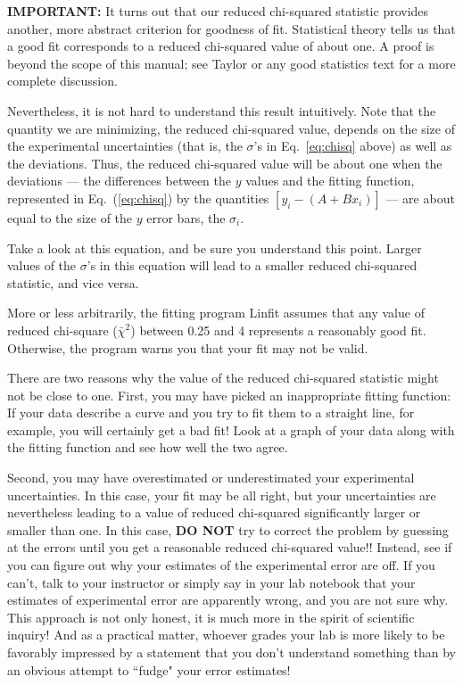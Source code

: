 {\bf IMPORTANT:}  It turns out that our reduced chi-squared statistic
provides another, more abstract criterion for goodness of fit.
Statistical theory tells us that a good fit corresponds to a reduced
chi-squared value of about one.  A proof is beyond the scope of
this manual; see Taylor or any good statistics text for a more
complete discussion.

Nevertheless, it is not hard to understand this result intuitively.
 Note that the quantity we are minimizing, the reduced
chi-squared value, depends on the size of the experimental
uncertainties (that is, the $\sigma$'s in Eq.~\ref{eq:chisq} above)
as well as the
deviations.   Thus, the reduced chi-squared value will be about one
when the deviations --- the differences between the $y$ values
and the fitting function, represented in Eq.~(\ref{eq:chisq}) by the
quantities $ \left[y_{i} -  (A + Bx_{i})\right] $ --- are about
equal to the size of the $y$ error bars, the $\sigma_i$.

Take a look at this equation, and be sure you understand
this point.  Larger values of the $\sigma$'s in this equation will
lead to a smaller reduced chi-squared statistic, and vice versa.

More or less arbitrarily, the fitting
program Linfit assumes that any value of reduced chi-square
($\bar{\chi}^2$) between 0.25 and 4 represents a
reasonably good fit.  Otherwise, the program warns you that your fit
may not be valid.

There are two reasons why the value of the reduced
chi-squared statistic might not be close to one.  First, you may have
picked an inappropriate fitting function: If your data describe a
curve and you try to fit them to a straight line, for example, you
will certainly get a bad fit!  Look at a graph of your data along with
the fitting function and see how well the two agree.

Second, you may have overestimated or underestimated your experimental
uncertainties.  In this case, your fit may be all right, but your
uncertainties are nevertheless leading to a value of reduced
chi-squared significantly larger or smaller than one.  In this case,
{\bf DO NOT} try to correct the problem by guessing at the errors until you
get a reasonable reduced chi-squared value!!  Instead, see if you can
figure out why your estimates of the experimental error are off.  If
you can't, talk to your instructor or simply say in your lab notebook
that your estimates of experimental error are apparently wrong, and
you are not sure why.  This approach is not only honest, it is much
more in the spirit of scientific inquiry!  And as a practical matter,
whoever grades your lab is more likely to be favorably impressed by a statement
that you don't understand something than by an obvious attempt to
``fudge" your error estimates!

